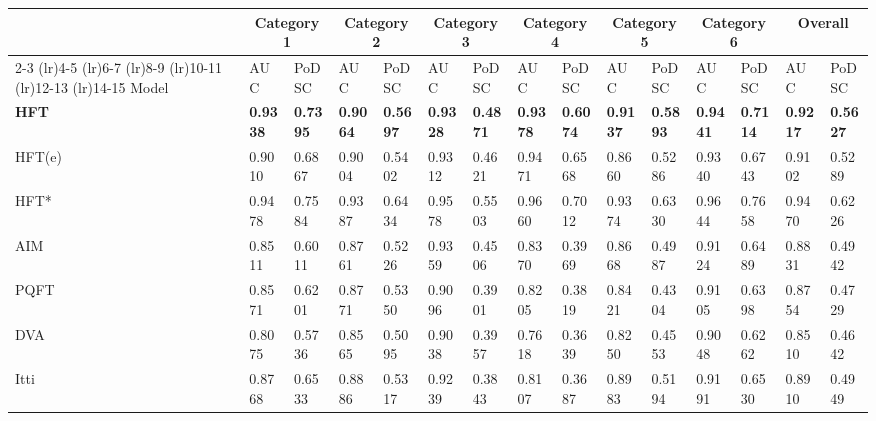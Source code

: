 \documentclass[10pt,journal,cspaper,compsoc]{IEEEtran}
\begin{document}
\begin{table*}[htbp] 	
\caption{Comparison between HFT class models and models in subset 2 (optimal smoothing parameters and the same border cut for each model)}
\label{AIM}	
\centering 	
\begin{tabular}{@{}lp{.78cm}p{.78cm}p{.78cm}p{.78cm}p{.78cm}p{.78cm}p{.78cm}p{.78cm}p{.78cm}p{.78cm}p{.78cm}p{.78cm}p{.78cm}p{.78cm}@{}}
\toprule
&\multicolumn{2}{c}{Category 1}
&\multicolumn{2}{c}{Category 2}
&\multicolumn{2}{c}{Category 3}
&\multicolumn{2}{c}{Category 4}
&\multicolumn{2}{c}{Category 5}
&\multicolumn{2}{c}{Category 6}
&\multicolumn{2}{c}{Overall}\\
\cmidrule(lr){2-3} \cmidrule(lr){4-5} \cmidrule(lr){6-7} \cmidrule(lr){8-9} \cmidrule(lr){10-11} \cmidrule(lr){12-13} \cmidrule(lr){14-15}
Model & \scriptsize{AUC} & \scriptsize{PoDSC}
& \scriptsize{AUC} & \scriptsize{PoDSC}
& \scriptsize{AUC} & \scriptsize{PoDSC}
& \scriptsize{AUC} & \scriptsize{PoDSC}
& \scriptsize{AUC} & \scriptsize{PoDSC}
& \scriptsize{AUC} & \scriptsize{PoDSC}
& \scriptsize{AUC} & \scriptsize{PoDSC}\\
\midrule


{\bf HFT} &{\bf0.9338}   &{\bf0.7395}   &{\bf0.9064}   &{\bf0.5697}   &{\bf0.9328}   &{\bf0.4871}  &{\bf0.9378}   &{\bf0.6074}     &{\bf0.9137}    &{\bf0.5893}   &{\bf0.9441}   &{\bf0.7114}   &{\bf0.9217}  &{\bf0.5627}\\
HFT(e)   &0.9010   &0.6867   &0.9004   &0.5402    &0.9312   &0.4621   &0.9471   &0.6568   &0.8660  &0.5286  &0.9340   &0.6743  &0.9102    &0.5289\\
HFT*   &0.9478  &0.7584    &0.9387  &0.6434    &0.9578   &0.5503   &0.9660   &0.7012   &0.9374    &0.6330    &0.9644   &0.7658   &0.9470  &0.6226\\
AIM &0.8511 &0.6011   &0.8761 &0.5226   &0.9359 &0.4506   &0.8370 &0.3969  &0.8668 &0.4987 &0.9124 &0.6489  &0.8831  &0.4942\\
PQFT &0.8571 &0.6201 &0.8771 &0.5350 &0.9096 &0.3901 &0.8205 &0.3819 &0.8421 &0.4304 &0.9105 &0.6398 &0.8754 &0.4729\\
DVA  &0.8075 &0.5736   &0.8565 &0.5095   &0.9038 &0.3957   &0.7618 &0.3639   &0.8250 &0.4553   &0.9048 &0.6262   &0.8510   &0.4642\\
Itti &0.8768 &0.6533 &0.8886 &0.5317 &0.9239 &0.3843 &0.8107 &0.3687 &0.8983 &0.5194 &0.9191 &0.6530 &0.8910 &0.4949\\
\bottomrule 	
\end{tabular} 	
\end{table*} 	
\end{document}
